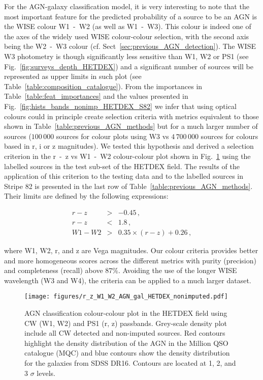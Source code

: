 \documentclass{aa}
\begin{document}
For the AGN-galaxy classification model, it is very interesting to note that the most important feature for the predicted probability of a source to be an AGN is the WISE colour W1~-~W2 (as well as W1~-~W3). This colour is indeed one of the axes of the widely used WISE colour-colour selection, with the second axis being the W2~-~W3 colour (cf. Sect~\ref{sec:previous_AGN_detection}). The WISE W3 photometry is though significantly less sensitive than W1, W2 or PS1 (see Fig.~\ref{fig:surveys_depth_HETDEX}) and a significant number of sources will be represented as upper limits in such plot (see Table~\ref{table:composition_catalogue}). From the importances in Table~\ref{table:feat_importances} and the values presented in Fig.~\ref{fig:hists_bands_nonimp_HETDEX_S82} we infer that using optical colours could in principle create selection criteria with metrics equivalent to those shown in Table~\ref{table:previous_AGN_methods} but for a much larger number of sources ($100\,000$ sources for colour plots using W3 vs $4\,700\,000$ sources for colours based in r, i or z magnitudes). We tested this hypothesis and derived a selection criterion in the r~-~z vs W1~-~W2 colour-colour plot shown in Fig.~\ref{fig:HETDEX_rz_W1W2_AGN_gal_class} using the labelled sources in the test sub-set of the HETDEX field. The results of the application of this criterion to the testing data and to the labelled sources in Stripe 82 is presented in the last row of Table~\ref{table:previous_AGN_methods}. Their limits are defined by the following expressions:

\begin{eqnarray}
r - z &>& -0.45\,,\\
r - z &<& 1.8\,,\\
W1 - W2 &>& 0.35 \times (r - z) + 0.26\,,
\end{eqnarray}

\noindent where W1, W2, r, and z are Vega magnitudes. Our colour criteria provides better and more homogeneous scores across the different metrics with purity (precision) and completeness (recall) above $87\%$. Avoiding the use of the longer WISE wavelength (W3 and W4), the criteria can be applied to a much larger dataset.


\begin{figure}
    \centering
    \begin{minipage}{0.99\columnwidth}
    \texttt{[image: figures/r\_z\_W1\_W2\_AGN\_gal\_HETDEX\_nonimputed.pdf]}
    \end{minipage}%
    \caption{AGN classification colour-colour plot in the HETDEX field using CW (W1, W2) and PS1 (r, z) passbands. Grey-scale density plot include all CW detected and non-imputed sources. Red contours highlight the density distribution of the AGN in the Million QSO catalogue (MQC) and blue contours show the density distribution for the galaxies from SDSS DR16. Contours are located at 1, 2, and 3 $\sigma$ levels.}
   \label{fig:HETDEX_rz_W1W2_AGN_gal_class}
\end{figure}
\end{document}
